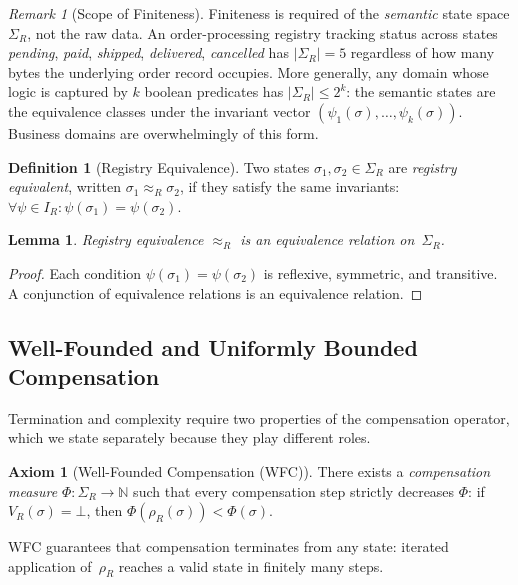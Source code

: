 \documentclass[11pt,a4paper]{article}
\theoremstyle{plain}
\newtheorem{lemma}[theorem]{Lemma}
\theoremstyle{definition}
\newtheorem{definition}[theorem]{Definition}
\newtheorem{axiom}[theorem]{Axiom}
\theoremstyle{remark}
\newtheorem{remark}[theorem]{Remark}
\begin{document}
\begin{remark}[Scope of Finiteness]
\label{rem:scope}
Finiteness is required of the \emph{semantic} state space $\Sigma_R$, not the
raw data.  An order-processing registry tracking status across states
\emph{pending}, \emph{paid}, \emph{shipped}, \emph{delivered},
\emph{cancelled} has $|\Sigma_R| = 5$ regardless of how many bytes the
underlying order record occupies.  More generally, any domain whose logic is
captured by $k$ boolean predicates has $|\Sigma_R| \leq 2^k$: the semantic
states are the equivalence classes under the invariant vector
$(\psi_1(\sigma), \ldots, \psi_k(\sigma))$.  Business domains are
overwhelmingly of this form.
\end{remark}

\begin{definition}[Registry Equivalence]
\label{def:equiv}
Two states $\sigma_1, \sigma_2 \in \Sigma_R$ are \emph{registry equivalent},
written $\sigma_1 \approx_R \sigma_2$, if they satisfy the same invariants:
$\forall \psi \in I_R: \psi(\sigma_1) = \psi(\sigma_2)$.
\end{definition}

\begin{lemma}
\label{lem:equiv-relation}
Registry equivalence $\approx_R$ is an equivalence relation on~$\Sigma_R$.
\end{lemma}
\begin{proof}
Each condition $\psi(\sigma_1) = \psi(\sigma_2)$ is reflexive, symmetric, and
transitive.  A conjunction of equivalence relations is an equivalence relation.
\end{proof}

\subsection{Well-Founded and Uniformly Bounded Compensation}

Termination and complexity require two properties of the compensation
operator, which we state separately because they play different roles.

\begin{axiom}[Well-Founded Compensation (WFC)]
\label{ax:wfc}
There exists a \emph{compensation measure}
$\Phi: \Sigma_R \to \mathbb{N}$ such that every compensation step strictly
decreases $\Phi$: if $V_R(\sigma) = \bot$, then
$\Phi(\rho_R(\sigma)) < \Phi(\sigma)$.
\end{axiom}

WFC guarantees that compensation terminates from any state: iterated
application of~$\rho_R$ reaches a valid state in finitely many steps.
\end{document}
